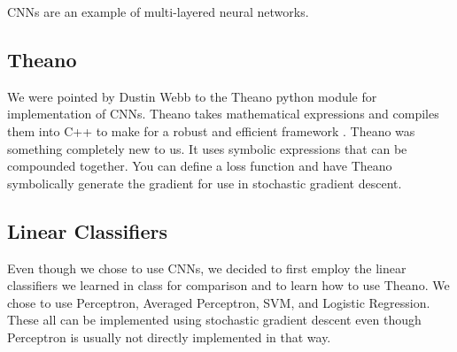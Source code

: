 CNNs are an example of multi-layered neural networks.

\subsection{Theano}

We were pointed by Dustin Webb to the Theano python module for implementation of CNNs.  Theano takes mathematical expressions and compiles them into C++ to make for a robust and efficient framework \cite{bergstra+al:2010-scipy}.  Theano was something completely new to us.  It uses symbolic expressions that can be compounded together.  You can define a loss function and have Theano symbolically generate the gradient for use in stochastic gradient descent.

\subsection{Linear Classifiers}

Even though we chose to use CNNs, we decided to first employ the linear classifiers we learned in class for comparison and to learn how to use Theano.  We chose to use Perceptron, Averaged Perceptron, SVM, and Logistic Regression.  These all can be implemented using stochastic gradient descent even though Perceptron is usually not directly implemented in that way.
